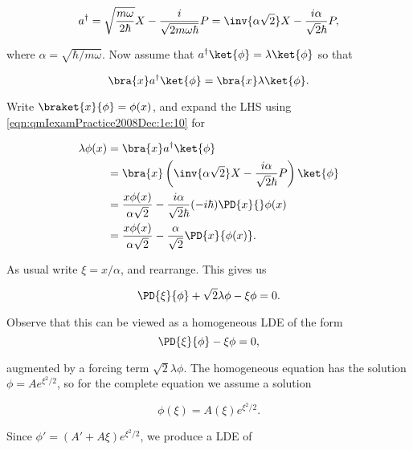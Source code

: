 \begin{equation}\label{eqn:qmIexamPractice2008Dec:1e:10}
a^\dagger 
= \sqrt{\frac{m \omega}{2 \hbar}} X - \frac{ i }{\sqrt{2 m \omega \hbar} } P
= \inv{ \alpha \sqrt{2} } X - \frac{ i \alpha }{\sqrt{2} \hbar } P,
\end{equation}

where $\alpha = \sqrt{\hbar/m \omega}$.  Now assume that $a^\dagger \ket{\phi} = \lambda \ket{\phi}$ so that 

\begin{equation}\label{eqn:qmIexamPractice2008Dec:1e:20}
\bra{x} a^\dagger \ket{\phi} = \bra{x} \lambda \ket{\phi}.
\end{equation}

Write $\braket{x}{\phi} = \phi(x)$, and expand the LHS using \ref{eqn:qmIexamPractice2008Dec:1e:10} for

\begin{align*}
\lambda \phi(x) 
&= \bra{x} a^\dagger \ket{\phi}  \\
&= \bra{x} \left( \inv{ \alpha \sqrt{2} } X - \frac{ i \alpha }{\sqrt{2} \hbar } P \right) \ket{\phi} \\
&= \frac{x \phi(x)}{ \alpha \sqrt{2} } - \frac{ i \alpha }{\sqrt{2} \hbar } (-i\hbar)\PD{x}{} \phi(x) \\
&= \frac{x \phi(x)}{ \alpha \sqrt{2} } - \frac{ \alpha }{\sqrt{2} } \PD{x}{\phi(x)}.
\end{align*}

As usual write $\xi = x/\alpha$, and rearrange.  This gives us

\begin{equation}\label{eqn:qmIexamPractice2008Dec:1e:30}
\PD{\xi}{\phi} +\sqrt{2} \lambda \phi - \xi \phi = 0.
\end{equation}

Observe that this can be viewed as a homogeneous LDE of the form
\begin{equation}\label{eqn:qmIexamPractice2008Dec:1e:40}
\PD{\xi}{\phi} - \xi \phi = 0,
\end{equation}

augmented by a forcing term $\sqrt{2}\lambda \phi$.  The homogeneous equation has the solution $\phi = A e^{\xi^2/2}$, so for the complete equation we assume a solution 

\begin{equation}\label{eqn:qmIexamPractice2008Dec:1e:50}
\phi(\xi) = A(\xi) e^{\xi^2/2}.
\end{equation}

Since $\phi' = (A' + A \xi) e^{\xi^2/2}$, we produce a LDE of

